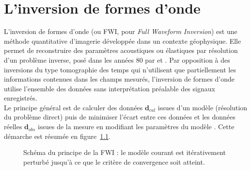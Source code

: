 \chapter{L'inversion de formes d'onde \label{fwi}}


L'inversion de formes d'onde (ou FWI, pour \emph{Full Waveform Inversion}) est une méthode quantitative d'imagerie développée dans un contexte géophysique. Elle permet de reconstruire des paramètres acoustiques ou élastiques par résolution d'un problème inverse, posé dans les années 80 par \cite{lailly} et \cite{tarantola_84}. Par opposition à des inversions du type tomographie des temps qui n'utilisent que partiellement les informations contenues dans les champs mesurés, l'inversion de formes d'onde utilise l'ensemble des données sans interprétation préalable des signaux enregistrés.\\

Le principe général est de calculer des données $\bm{d}_{cal}$ issues d'un modèle (résolution du problème direct)  puis de minimiser l'écart entre ces données et les données réelles $\bm{d}_{obs}$ issues de la mesure en modifiant les paramètres du modèle \citep{virieux_review}. Cette démarche est résumée en figure~\ref{schema_fwi}. \\


\begin{figure}[!h]
	\centering
	\caption{ Schéma du principe de la FWI : le modèle courant est itérativement perturbé jusqu'à ce que le critère de convergence soit atteint.\label{schema_fwi}}
\end{figure}

